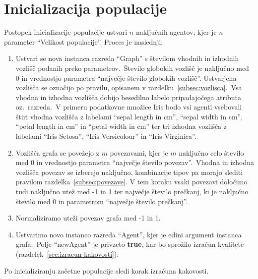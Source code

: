 \documentclass[a4paper,12pt,openright]{book}
\begin{document}
    \section{Inicializacija populacije}\label{sec:inicializacija-populacije}
    Postopek inicializacije populacije ustvari $n$ naključnih agentov, kjer je $n$ parameter \enquote{Velikost populacije}.
    Proces je naslednji:
    \begin{enumerate}
        \item Ustvari se nova instanca razreda \enquote{Graph} s številom vhodnih in izhodnih vozlišč podanih
        preko parametrov.\ Število globokih vozlišč je naključno med 0 in vrednostjo parametra \enquote{največje število globokih vozlišč}.
        Ustvarjena vozlišča se označijo po pravilu, opisanem v razdelku~\ref{subsec:vozlisca}.\ Vsa vhodna in izhodna vozlišča
        dobijo besedilno labelo pripadajočega atributa oz.\ razreda.\ V primeru podatkovne množice Iris bodo vsi agenti
        vsebovali štiri vhodna vozlišča z labelami \enquote{sepal length in cm}, \enquote{sepal width in cm}, \enquote{petal length in cm} in
        \enquote{petal width in cm} ter tri izhodna vozlišča z labelami \enquote{Iris Setosa}, \enquote{Iris Versicolour} in
        \enquote{Iris Virginica}.
        \item Vozlišča grafa se povežejo z $m$ povezavami, kjer je $m$ naključno celo število med 0 in vrednostjo
        parametra \enquote{največje število povezav}.\ Vhodna in izhodna vozlišča povezav se izberejo naključno, kombinacije tipov pa
        morajo slediti pravilom razdelka~\ref{subsec:povezave}.
        V tem koraku vsaki povezavi določimo tudi naključno utež med -1 in 1 ter največje število prečkanj, ki je naključno število med 0 in parametrom
        \enquote{največje število prečkanj}.
        \item Normaliziramo uteži povezav grafa med -1 in 1.
        \item Ustvarimo novo instanco razreda \enquote{Agent}, kjer je edini argument instanca grafa.\ Polje \enquote{newAgent}
        je privzeto \textbf{true}, kar bo sprožilo izračun kvalitete (razdelek~\ref{sec:izracun-kakovosti}).
    \end{enumerate}
    Po inicializiranju začetne populacije sledi korak izračuna kakovosti.
\end{document}
